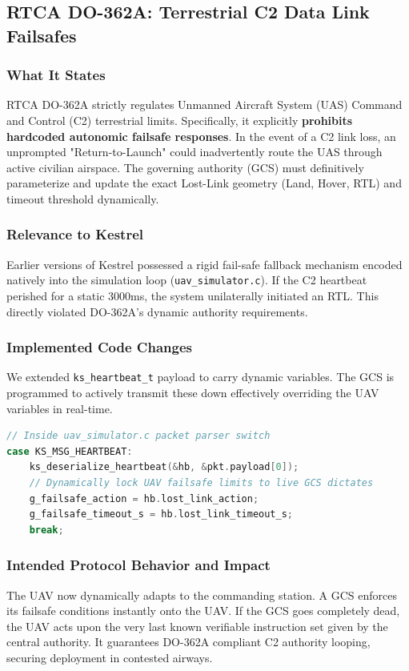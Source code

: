 \documentclass[11pt,a4paper]{article}
\begin{document}
\subsection{RTCA DO-362A: Terrestrial C2 Data Link Failsafes}

\subsubsection{What It States}
RTCA DO-362A strictly regulates Unmanned Aircraft System (UAS) Command and Control (C2) terrestrial limits. Specifically, it explicitly \textbf{prohibits hardcoded autonomic failsafe responses}. In the event of a C2 link loss, an unprompted "Return-to-Launch" could inadvertently route the UAS through active civilian airspace. The governing authority (GCS) must definitively parameterize and update the exact Lost-Link geometry (Land, Hover, RTL) and timeout threshold dynamically.

\subsubsection{Relevance to Kestrel}
Earlier versions of Kestrel possessed a rigid fail-safe fallback mechanism encoded natively into the simulation loop (\texttt{uav\_simulator.c}). If the C2 heartbeat perished for a static 3000ms, the system unilaterally initiated an RTL. This directly violated DO-362A's dynamic authority requirements.

\subsubsection{Implemented Code Changes}

We extended \texttt{ks\_heartbeat\_t} payload to carry dynamic variables. The GCS is programmed to actively transmit these down effectively overriding the UAV variables in real-time.

\begin{lstlisting}[language=C, caption={UAV Heartbeat Parser State Lock (\texttt{uav\_simulator.c})}]
// Inside uav_simulator.c packet parser switch
case KS_MSG_HEARTBEAT:
    ks_deserialize_heartbeat(&hb, &pkt.payload[0]);
    // Dynamically lock UAV failsafe limits to live GCS dictates
    g_failsafe_action = hb.lost_link_action;
    g_failsafe_timeout_s = hb.lost_link_timeout_s;
    break;
\end{lstlisting}

\subsubsection{Intended Protocol Behavior and Impact}
The UAV now dynamically adapts to the commanding station. A GCS enforces its failsafe conditions instantly onto the UAV. If the GCS goes completely dead, the UAV acts upon the very last known verifiable instruction set given by the central authority. It guarantees DO-362A compliant C2 authority looping, securing deployment in contested airways.
\end{document}
